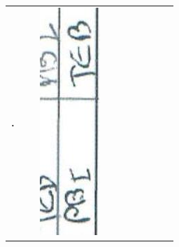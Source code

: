 \documentclass[10pt]{article}
\begin{document}
\begin{center}
\begin{tabular}{|c|c|c|c|c|c|c|c|c|c|}
． &  & \includegraphics[max width=\textwidth]{2025_02_27_dd68c3d38de88f0516d9g-070(3)}

\end{tabular}
\end{center}
\end{document}
